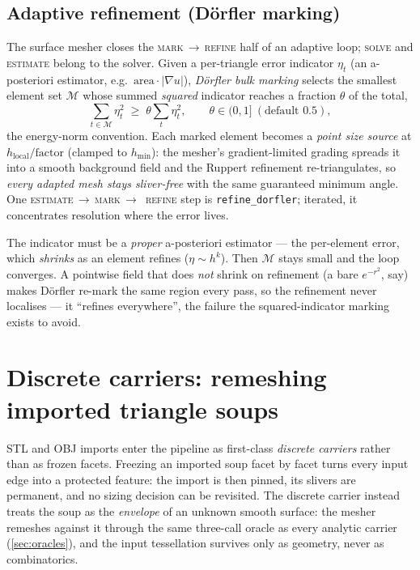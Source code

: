 \documentclass[11pt,a4paper]{article}
\numberwithin{equation}{section}
\DeclareRobustCommand{\code}[1]{\texttt{#1}}
\begin{document}
\subsection{Adaptive refinement (D\"orfler marking)}
\label{sec:amr}
The surface mesher closes the \textsc{mark}\,$\to$\,\textsc{refine} half of an
adaptive loop; \textsc{solve} and \textsc{estimate} belong to the solver. Given a
per-triangle error indicator $\eta_t$ (an a-posteriori estimator, e.g.\
$\mathrm{area}\cdot\lvert\nabla u\rvert$), \emph{D\"orfler bulk marking}
\cite{Doerfler1996} selects the smallest element set $\mathcal{M}$ whose summed
\emph{squared} indicator reaches a fraction $\theta$ of the total,
\begin{equation}
  \sum_{t\in\mathcal{M}} \eta_t^2 \;\ge\; \theta \sum_t \eta_t^2,
  \qquad \theta\in(0,1]\ (\text{default }0.5),
  \label{eq:dorfler}
\end{equation}
the energy-norm convention. Each marked element becomes a \emph{point size source}
at $h_{\text{local}}/\text{factor}$ (clamped to $h_{\min}$): the mesher's
gradient-limited grading spreads it into a smooth background field and the Ruppert
refinement re-triangulates, so \emph{every adapted mesh stays sliver-free} with the
same guaranteed minimum angle. One \textsc{estimate}\,$\to$\,\textsc{mark}\,$\to$%
\,\textsc{refine} step is \code{refine\_dorfler}; iterated, it concentrates
resolution where the error lives.

The indicator must be a \emph{proper} a-posteriori estimator --- the per-element
error, which \emph{shrinks} as an element refines ($\eta\sim h^k$). Then
$\mathcal{M}$ stays small and the loop converges. A pointwise field that does
\emph{not} shrink on refinement (a bare $e^{-r^2}$, say) makes D\"orfler re-mark the
same region every pass, so the refinement never localises --- it ``refines
everywhere'', the failure the squared-indicator marking exists to avoid.

\section{Discrete carriers: remeshing imported triangle soups}
\label{sec:discrete}
STL and OBJ imports enter the pipeline as first-class \emph{discrete carriers}
rather than as frozen facets. Freezing an imported soup facet by facet turns
every input edge into a protected feature: the import is then pinned, its
slivers are permanent, and no sizing decision can be revisited. The discrete
carrier instead treats the soup as the \emph{envelope} of an unknown smooth
surface: the mesher remeshes against it through the same three-call oracle as
every analytic carrier (\cref{sec:oracles}), and the input tessellation
survives only as geometry, never as combinatorics.
\end{document}
